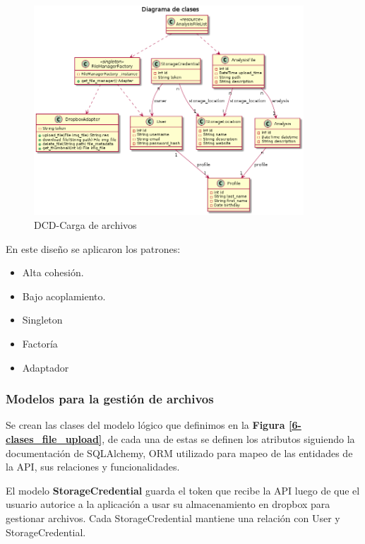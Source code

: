 	\begin{figure}[h]
        \centering
        \includegraphics[width=0.9\textwidth]{img/dcd_file_upload}
        \caption{DCD-Carga de archivos}
		\label{6-dcd_file_upload}
    \end{figure}
   
\newpage

	En este diseño se aplicaron los patrones:
		\begin{itemize}			
			\item Alta cohesión.
			\item Bajo acoplamiento.
			\item Singleton
			\item Factoría
			\item Adaptador
		\end{itemize}

\subsubsection{Modelos para la gestión de archivos}

Se crean las clases del modelo lógico que definimos en la \textbf{Figura \ref{6-clases_file_upload}}, de cada una de estas se definen los atributos siguiendo la documentación de SQLAlchemy, ORM utilizado para mapeo de las entidades de la API, sus relaciones y funcionalidades. 

El modelo \textbf{StorageCredential} guarda el token que recibe la API luego de que el usuario autorice a la aplicación a usar su almacenamiento en dropbox para gestionar archivos. Cada StorageCredential mantiene una relación con User y StorageCredential.

